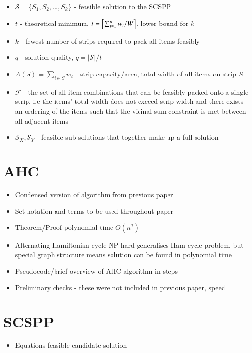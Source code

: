 \documentclass{elsarticle}
\begin{document}
\begin{itemize}
	\item $\mathcal{S} = \{S_1, S_2,...,S_k\}$ - feasible solution to the SCSPP
	\item $t$ - theoretical minimum, $t = \ceil*{\sum_{i=1}^{n}w_i / W}$, lower bound for $k$
	\item $k$ - fewest number of strips required to pack all items feasibly
	\item $q$ - solution quality, $q = |\mathcal{S}| / t$
	\item $A(S) = \sum_{i \in S}w_i$ - strip capacity/area, total width of all items on strip $S$
	\item $\mathcal{F}$ - the set of all item combinations that can be feasibly packed onto a single strip, i.e the items' total width does not exceed strip width and there exists an ordering of the items such that the vicinal sum constraint is met between all adjacent items
	\item $\mathcal{S}_X, \mathcal{S}_Y$ - feasible sub-solutions that together make up a full solution
\end{itemize}

\section{AHC}
\begin{itemize}
	\item Condensed version of algorithm from previous paper
	\item Set notation and terms to be used throughout paper
	\item Theorem/Proof polynomial time $O(n^2)$
	\item Alternating Hamiltonian cycle NP-hard generalises Ham cycle problem, but special graph structure means solution can be found in polynomial time
	\item Pseudocode/brief overview of AHC algorithm in steps
	\item Preliminary checks - these were not included in previous paper, speed
\end{itemize}

\section{SCSPP}
\begin{itemize}
	\item Equations feasible candidate solution
\end{itemize}
\end{document}
